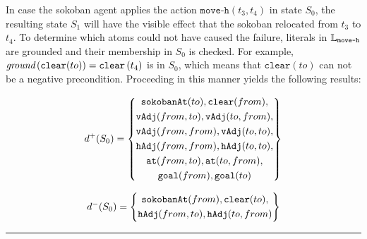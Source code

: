 \documentclass[\master/Master.tex]{subfiles}
\begin{document}
\begin{example} \label{ex:moveSucceeded}
    In case the sokoban agent applies the action $\texttt{move-h}(t_3, t_4)$ in state $S_0$, the resulting state $S_1$ will have the visible effect that the sokoban relocated from $t_3$ to $t_4$. To determine which atoms could not have caused the failure, literals in $\mathbb{L}_{\texttt{move-h}}$ are grounded and their membership in $S_0$ is checked. For example, $\textit{ground} \left( \texttt{clear}(to) \right) = \texttt{clear}\left( t_4 \right)$ is in $S_0$, which means that $\texttt{clear}(to)$ can not be a negative precondition. Proceeding in this manner yields the following results:

    \begin{equation*}
        d^+(S_0) = \left\{
            \begin{gathered}
                \texttt{sokobanAt}(to), \texttt{clear}(from), \\
                \texttt{vAdj}(from, to), \texttt{vAdj}(to, from), \\
                \texttt{vAdj}(from, from), \texttt{vAdj}(to, to), \\
                \texttt{hAdj}(from, from), \texttt{hAdj}(to, to), \\
                \texttt{at}(from, to), \texttt{at}(to, from), \\
                \texttt{goal}(from), \texttt{goal}(to)
            \end{gathered}
        \right\}
    \end{equation*}

    \begin{equation*}
        d^-(S_0) = \left\{
            \begin{gathered}
                \texttt{sokobanAt}(from), \texttt{clear}(to), \\
                \texttt{hAdj}(from, to), \texttt{hAdj}(to, from)
            \end{gathered}
        \right\}
    \end{equation*}

    \noindent\rule{\textwidth}{1pt}
\end{example}
\end{document}
